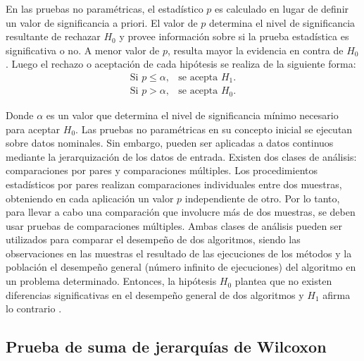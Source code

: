 En las pruebas no paramétricas, el estadístico $p$ es calculado en lugar de definir un valor de significancia a priori. El valor de $p$ determina el nivel de significancia resultante de rechazar $H_0$ y provee información sobre si la prueba estadística es significativa o no. A menor valor de $p$, resulta mayor la evidencia en contra de $H_0$. Luego el rechazo o aceptación de cada hipótesis se realiza de la siguiente forma:
\begin{eqnarray}
\text{Si } p \leq \alpha,& \text{se acepta } H_1.\\
\text{Si } p> \alpha,& \text{se acepta } H_0.
\end{eqnarray}

Donde $\alpha$ es un valor que determina el nivel de significancia mínimo necesario para aceptar $H_0$. Las pruebas no paramétricas en su concepto inicial se ejecutan sobre datos nominales. Sin embargo, pueden ser aplicadas a datos continuos mediante la jerarquización de los datos de entrada. Existen dos clases de análisis: comparaciones por pares y comparaciones múltiples. Los procedimientos estadísticos por pares realizan comparaciones individuales entre dos muestras, obteniendo en cada aplicación un valor $p$ independiente de otro. Por lo tanto, para llevar a cabo una comparación que involucre más de dos muestras, se deben usar pruebas de comparaciones múltiples. Ambas clases de análisis pueden ser utilizados para comparar el desempeño de dos algoritmos, siendo las observaciones en las muestras el resultado de las ejecuciones de los métodos y  la población el desempeño general (número infinito de ejecuciones) del algoritmo en un problema determinado.  Entonces, la hipótesis $H_0$ plantea que no existen diferencias significativas en el desempeño general de dos algoritmos y $H_1$ afirma lo contrario   \cite{derrac2011practical}.


\subsection{Prueba de suma de jerarquías de Wilcoxon}

